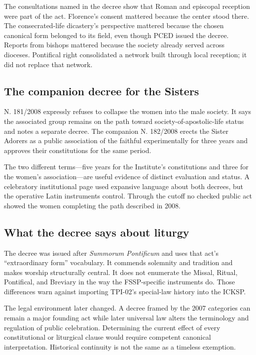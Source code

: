 The consultations named in the decree show that Roman and episcopal reception were part of the act. Florence's consent mattered because the center stood there. The consecrated-life dicastery's perspective mattered because the chosen canonical form belonged to its field, even though PCED issued the decree. Reports from bishops mattered because the society already served across dioceses. Pontifical right consolidated a network built through local reception; it did not replace that network.

\subsection{The companion decree for the Sisters}

N. 181/2008 expressly refuses to collapse the women into the male society. It says the associated group remains on the path toward society-of-apostolic-life status and notes a separate decree. The companion N. 182/2008 erects the Sister Adorers as a public association of the faithful experimentally for three years and approves their constitutions for the same period.

The two different terms---five years for the Institute's constitutions and three for the women's association---are useful evidence of distinct evaluation and status. A celebratory institutional page used expansive language about both decrees, but the operative Latin instruments control. Through the cutoff no checked public act showed the women completing the path described in 2008.

\subsection{What the decree says about liturgy}

The decree was issued after \emph{Summorum Pontificum} and uses that act's ``extraordinary form'' vocabulary. It commends solemnity and tradition and makes worship structurally central. It does not enumerate the Missal, Ritual, Pontifical, and Breviary in the way the FSSP-specific instruments do. Those differences warn against importing TPI-02's special-law history into the ICKSP.

The legal environment later changed. A decree framed by the 2007 categories can remain a major founding act while later universal law alters the terminology and regulation of public celebration. Determining the current effect of every constitutional or liturgical clause would require competent canonical interpretation. Historical continuity is not the same as a timeless exemption.

